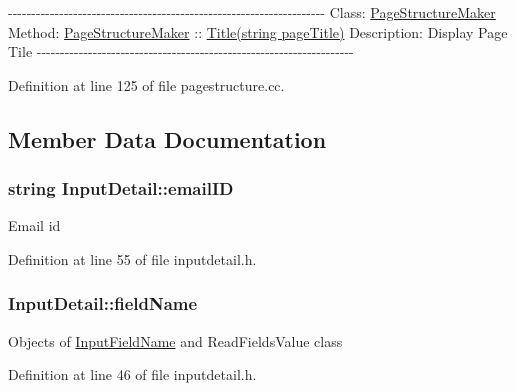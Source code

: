-\/-\/-\/-\/-\/-\/-\/-\/-\/-\/-\/-\/-\/-\/-\/-\/-\/-\/-\/-\/-\/-\/-\/-\/-\/-\/-\/-\/-\/-\/-\/-\/-\/-\/-\/-\/-\/-\/-\/-\/-\/-\/-\/-\/-\/-\/-\/-\/-\/-\/-\/-\/-\/-\/-\/-\/-\/-\/-\/-\/-\/-\/-\/-\/-\/-\/-\/-\/ Class\-: \hyperlink{classPageStructureMaker}{Page\-Structure\-Maker} Method\-: \hyperlink{classPageStructureMaker}{Page\-Structure\-Maker} \-:\-: \hyperlink{classPageStructureMaker_a81e902ddc0c0287df1ba0f614a3774d6}{Title(string page\-Title)} Description\-: Display Page Tile -\/-\/-\/-\/-\/-\/-\/-\/-\/-\/-\/-\/-\/-\/-\/-\/-\/-\/-\/-\/-\/-\/-\/-\/-\/-\/-\/-\/-\/-\/-\/-\/-\/-\/-\/-\/-\/-\/-\/-\/-\/-\/-\/-\/-\/-\/-\/-\/-\/-\/-\/-\/-\/-\/-\/-\/-\/-\/-\/-\/-\/-\/-\/-\/-\/-\/-\/-\/ 

Definition at line 125 of file pagestructure.\-cc.



\subsection{Member Data Documentation}
\hypertarget{classInputDetail_ad3f1db4fddbe0d4efbf1d5bc74d52257}{
\subsubsection[{email\-I\-D}]{\setlength{\rightskip}{0pt plus 5cm}string Input\-Detail\-::email\-I\-D\hspace{0.3cm}{\ttfamily [protected]}}}\label{classInputDetail_ad3f1db4fddbe0d4efbf1d5bc74d52257}
Email id 

Definition at line 55 of file inputdetail.\-h.

\hypertarget{classInputDetail_ac6f85380c5152c406d483726382c4798}{
\subsubsection[{field\-Name}]{ Input\-Detail\-::field\-Name\hspace{0.3cm}{\ttfamily [protected]}}}\label{classInputDetail_ac6f85380c5152c406d483726382c4798}
Objects of \hyperlink{classInputFieldName}{Input\-Field\-Name} and Read\-Fields\-Value class 

Definition at line 46 of file inputdetail.\-h.

